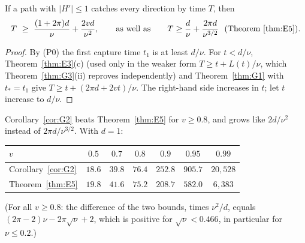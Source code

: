 \begin{corollary}[G2, lower bound, $\varepsilon=0$]\label{cor:G2}
If a path with $|H'|\le1$ catches every direction by time $T$, then
\[
T\ \ge\ \frac{(1+2\pi)d}{\nu}+\frac{2vd}{\nu^2},
\qquad\text{as well as}\qquad T\ge\frac d\nu+\frac{2\pi d}{\nu^{3/2}}\ \ \text{(Theorem~\ref{thm:E5})}.
\]
\end{corollary}
\begin{proof}
By (P0) the first capture time $t_1$ is at least $d/\nu$. For $t<d/\nu$, Theorem~\ref{thm:E3}(c) (used only in the weaker form
$T\ge t+L(t)/\nu$, which Theorem~\ref{thm:G3}(ii) reproves independently) and Theorem~\ref{thm:G1} with $t_*=t_1$ give
$T\ge t+(2\pi d+2vt)/\nu$. The right-hand side increases in $t$; let $t$ increase to $d/\nu$.
\end{proof}

\begin{remark}\label{rem:G2-E5}
Corollary~\ref{cor:G2} beats Theorem~\ref{thm:E5} for $v\ge0.8$, and grows like $2d/\nu^2$ instead of $2\pi d/\nu^{3/2}$. With $d=1$:
\begin{center}
\begin{tabular}{@{}lcccccc@{}}
\toprule
$v$ & $0.5$ & $0.7$ & $0.8$ & $0.9$ & $0.95$ & $0.99$\\
\midrule
Corollary~\ref{cor:G2} & $18.6$ & $39.8$ & $76.4$ & $252.8$ & $905.7$ & $20{,}528$\\
Theorem~\ref{thm:E5} & $19.8$ & $41.6$ & $75.2$ & $208.7$ & $582.0$ & $6{,}383$\\
\bottomrule
\end{tabular}
\end{center}
(For all $v\ge0.8$: the difference of the two bounds, times $\nu^2/d$, equals $(2\pi-2)\nu-2\pi\sqrt\nu+2$, which is positive for
$\sqrt\nu<0.466$, in particular for $\nu\le0.2$.)
\end{remark}

